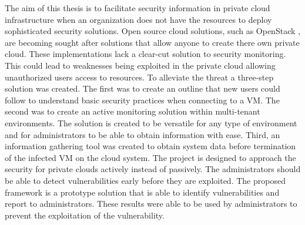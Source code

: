 \documentclass[12pt]{article}
\begin{document}
The aim of this thesis is to facilitate security information in private cloud infrastructure when an organization does not have the resources to deploy sophisticated security solutions. Open source cloud solutions, such as OpenStack \cite{Openstack}, are becoming sought after solutions that allow anyone to create there own private cloud. These implementations lack a clear-cut solution to security monitoring. This could lead to weaknesses being exploited in the private cloud allowing unauthorized users access to resources. To alleviate the threat a three-step solution was created. The first was to create an outline that new users could follow to understand basic security practices when connecting to a VM. The second was to create an active monitoring solution within multi-tenant environments. The solution is created to be versatile for any type of environment and for administrators to be able to obtain information with ease. Third, an information gathering tool was created to obtain system data before termination of the infected VM on the cloud system. The project is designed to approach the security for private clouds actively instead of passively. The administrators should be able to detect vulnerabilities early before they are exploited. The proposed framework is a prototype solution that is able to identify vulnerabilities and report to administrators. These results were able to be used by administrators to prevent the exploitation of the vulnerability.
\end{document}
